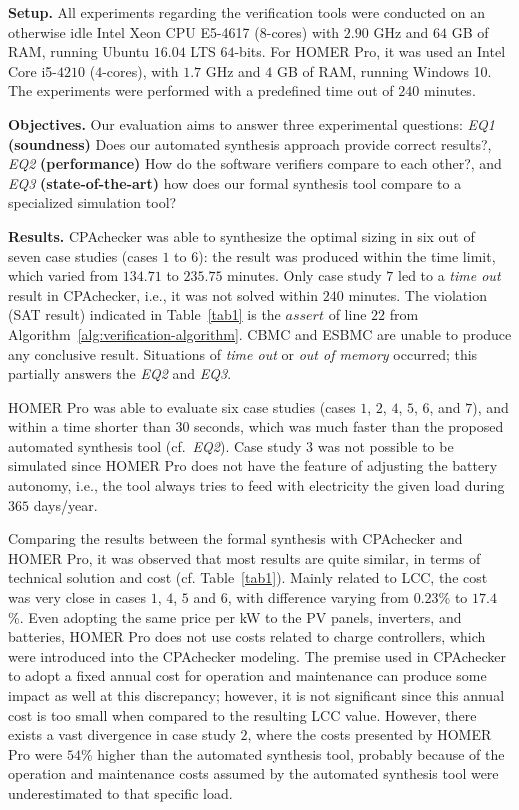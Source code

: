 \documentclass[runningheads]{llncs}
\begin{document}
\noindent \textbf{Setup.} All experiments regarding the verification tools were conducted on an otherwise idle Intel Xeon CPU E5-4617 ($8$-cores) with $2.90$ GHz and $64$ GB of RAM, running Ubuntu $16.04$ LTS $64$-bits. For HOMER Pro, it was used an Intel Core i5-$4210$ ($4$-cores), with $1.7$ GHz and $4$ GB of RAM, running Windows 10. The experiments were performed with a predefined time out of $240$ minutes.

\noindent \textbf{Objectives.} Our evaluation aims to answer three experimental questions: 
\textit{EQ1} \textbf{(soundness)} Does our automated synthesis approach provide correct results?, 
\textit{EQ2} \textbf{(performance)} How do the software verifiers compare to each other?, and 
\textit{EQ3} \textbf{(state-of-the-art)} how does our formal synthesis tool compare to a specialized simulation tool?

\noindent \textbf{Results.} CPAchecker was able to synthesize the optimal sizing in six out of seven case studies (cases $1$ to $6$): the result was produced within the time limit, which varied from $134.71$ to $235.75$ minutes. 
Only case study $7$ led to a \textit{time out} result in CPAchecker, i.e., it was not solved within $240$ minutes.
The violation (SAT result) indicated in Table~\ref{tab1} 
is the $assert$ of line $22$ from Algorithm~\ref{alg:verification-algorithm}. CBMC and ESBMC are unable to produce any conclusive result. Situations of \textit{time out} or \textit{out of memory} occurred; this partially answers the \textit{EQ2} and \textit{EQ3}. 

HOMER Pro was able to evaluate six case studies (cases $1$, $2$, $4$, $5$, $6$, and $7$), and within a time shorter than $30$ seconds, which was much faster than the proposed automated synthesis tool (cf.~\textit{EQ2}). Case study $3$ was not possible to be simulated since HOMER Pro does not have the feature of adjusting the battery autonomy, i.e., the tool always tries to feed with electricity the given load during $365$ days/year. 

Comparing the results between the formal synthesis with CPAchecker and HOMER Pro, it was observed that most results are quite similar, in terms of technical solution and cost (cf. Table~\ref{tab1}). Mainly related to LCC, the cost was very close in cases $1$, $4$, $5$ and $6$, with difference varying from $0.23$\% to $17.4$\%. Even adopting the same price per kW to the PV panels, inverters, and batteries, HOMER Pro does not use costs related to charge controllers, which were introduced into the CPAchecker modeling. The premise used in CPAchecker to adopt a fixed annual cost for operation and maintenance can produce some impact as well at this discrepancy; however, it is not significant since this annual cost is too small when compared to the resulting LCC value. However, there exists a vast divergence in case study $2$, where the costs presented by HOMER Pro were $54$\% higher than the automated synthesis tool, probably because of the operation and maintenance costs assumed by the automated synthesis tool were underestimated to that specific load. 
\end{document}
